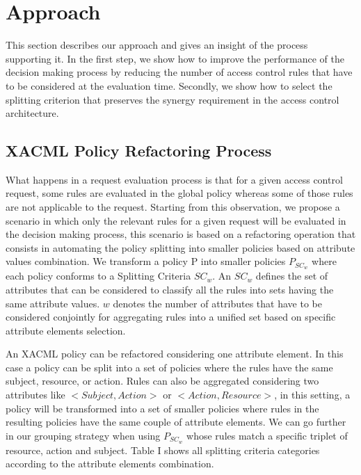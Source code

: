 



\section{Approach} \label{sec:approach}
This section describes our approach and gives an insight of the process supporting it. In the first step, we show how to improve the performance of the 
decision making process by reducing the number of access control rules that have to be considered at the evaluation time. Secondly, we show how to select 
the splitting criterion that preserves the synergy requirement in the access control architecture.

\subsection{XACML Policy Refactoring Process}
What happens in a request evaluation process is that for a given access control request, some rules are evaluated in the global policy whereas some of those rules are not
 applicable to the request. Starting from this observation, we propose a scenario in which only the relevant rules for a given request will be evaluated
 in the decision making process, this scenario is based on a refactoring operation that consists in automating the policy splitting 
into smaller policies based on attribute values combination. We transform a policy P into smaller policies \normalsize $P_{SC_{w}}$ where each policy
 conforms to a Splitting Criteria $SC_{w}$.
An $SC_{w}$ defines the set of attributes that can be considered to classify all the rules into sets having the 
same attribute values. $w$ denotes the number of attributes that have to be considered conjointly for aggregating rules into
 a unified set based on specific attribute elements selection.

An XACML policy can be refactored considering one attribute element. In this case a policy can be split into a set of policies where the 
rules have the same subject, resource, or action. Rules can also be aggregated considering two attributes like $<Subject, Action>$ or
 $<Action, Resource>$, in this setting, a policy will be transformed into a set of smaller policies where rules in the resulting policies have the same 
couple of attribute elements. 
We can go further in our grouping strategy when using $P_{SC_{w}}$ whose 
rules match a specific triplet of resource, action and subject. Table I shows all splitting criteria categories according to the attribute elements combination.


